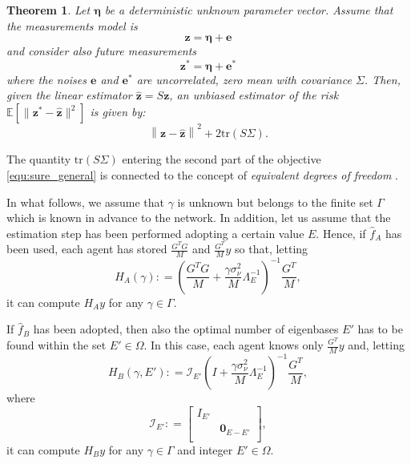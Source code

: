 \documentclass[10pt,twocolumn,twoside]{IEEEtran}					%
\newcounter{generalCounter}
\theoremstyle	{plain}
\newtheorem		{theorem}		[generalCounter]	{Theorem}
\newcommand{\TraceOf}				[1]	{\mathrm{tr} \left( #1 \right)}
\newcommand{\DefinedAs}			[0]	{\mathrel{\mathop:}=}
\newcommand{\Expectation}					[0]	{\mathbb{E}}
\newcommand{\ExpectationOf}					[1]	{\Expectation \left[ #1 \right]}
\begin{document}
\begin{theorem}
Let $\bm{\eta}$ be a deterministic unknown parameter vector. Assume that the measurements model is
$$
\bm{z} = \bm{\eta}+ \bm{e}
$$
and consider also future measurements 
$$
\bm{z}^{\ast} = \bm{\eta} + \bm{e}^{\ast}
$$ 
where the noises $\bm{e}$ and $\bm{e}^{\ast}$ are uncorrelated, zero mean with covariance $\Sigma$. Then, given the linear estimator $\widehat{\bm{z}}=S \bm{z}$, an unbiased estimator of the risk $\ExpectationOf{\| \bm{z}^{\ast} -\widehat{\bm{z}}\|^2}$ is given by:
\begin{equation}
	\left\|
		\bm{z} - \widehat{\bm{z}}
	\right\|^{2}
	+
	2 \TraceOf{S \Sigma} .
	\label{equ:sure_general}
\end{equation}
\end{theorem}
\noindent The quantity $\TraceOf{S \Sigma}$ entering the second part of the objective \eqref{equ:sure_general} is connected to the concept of \emph{equivalent degrees of freedom} \cite{Mackay:92,DeNicolao1}.



In what follows, we assume that $\gamma$ is unknown but belongs to the finite set $\Gamma$ which is known in advance to the network. In addition, let us assume that the estimation step has been performed adopting a certain value $E$. Hence, if $\widehat{f}_{A}$ has been used, each agent has stored $\frac{G^{T} G}{M}$ and $\frac{G^{T}}{M}y$ so that, letting
$$
H_{A}(\gamma)
\DefinedAs
\left( \frac{G^{T} G}{M} + \frac{\gamma \sigma^{2}_{\nu}}{ M} \Lambda^{-1}_{E} \right)^{-1} \frac{G^{T}}{M},
$$
it can compute $H_Ay$ for any $\gamma \in \Gamma$.

 If $\widehat{f}_{B}$ has been adopted, then also the optimal number of eigenbases $E'$ has to be found within the set $E' \in \Omega$. In this case, each agent knows only $\frac{G^{T}}{M}y$ and, letting 
\begin{equation}
	H_{B}(\gamma,E')
	\DefinedAs
	\mathcal{I}_{E'} \left( I + \frac{\gamma \sigma^{2}_{\nu}}{M} \Lambda^{-1}_{E} \right)^{-1} \frac{G^{T}}{M},
	\label{equ:definition_of_H_B_gamma_E_prime}
\end{equation}
where
\begin{equation}
	\mathcal{I}_{E'}
	\DefinedAs
	\begin{bmatrix}
		I_{E'} & \\
		& \bm{0}_{E - E'}\\
	\end{bmatrix},
	\label{equ:definition_of_mathcal_I_of_E}
\end{equation}
it can compute $H_By$ for any $\gamma \in \Gamma$ and integer $E' \in \Omega$.
\end{document}
